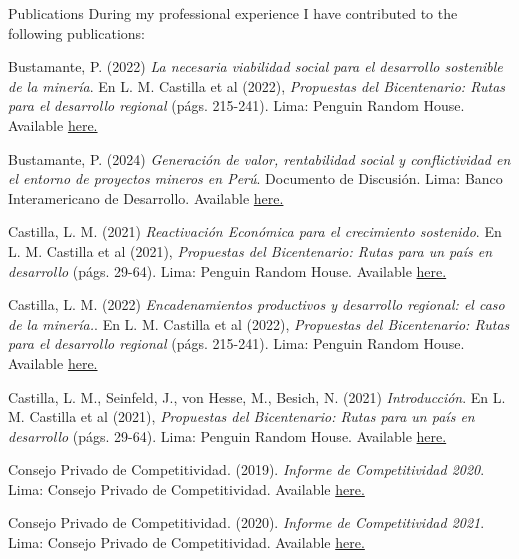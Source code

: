 \documentclass{resume} %
\begin{document}
\begin{rSection}{Publications}
During my professional experience I have contributed to the following publications:
\item Bustamante, P. (2022) \emph{La necesaria viabilidad social para el desarrollo sostenible de la minería}. En L. M. Castilla et al (2022), \textit{Propuestas del Bicentenario: Rutas para el desarrollo regional} (págs. 215-241). Lima: Penguin Random House. Available \href{https://www.casadellibro.com/ebook-propuestas-del-bicentenario-ebook/9786125068026/13125397}{here.}
\item Bustamante, P. (2024) \emph{Generación de valor, rentabilidad social y conflictividad en el entorno de proyectos mineros en Perú}. Documento de Discusión. Lima: Banco Interamericano de Desarrollo. Available \href{https://publications.iadb.org/es/generacion-de-valor-rentabilidad-social-y-conflictividad-en-el-entorno-de-proyectos-mineros-en-peru}{here.}
\item Castilla, L. M. (2021) \emph{Reactivación Económica para el crecimiento sostenido}. En L. M. Castilla et al (2021), \textit{Propuestas del Bicentenario: Rutas para un país en desarrollo} (págs. 29-64). Lima: Penguin Random House. Available \href{https://www.casadellibro.com/ebook-propuestas-del-bicentenario-ebook/9786124272813/12336851}{here.}
\item Castilla, L. M. (2022) \emph{Encadenamientos productivos y desarrollo regional: el caso de la minería.}.  En L. M. Castilla et al (2022), \textit{Propuestas del Bicentenario: Rutas para el desarrollo regional} (págs. 215-241). Lima: Penguin Random House. Available \href{https://www.casadellibro.com/ebook-propuestas-del-bicentenario-ebook/9786125068026/13125397}{here.} 
\item Castilla, L. M., Seinfeld, J., von Hesse, M., Besich, N. (2021) \emph{Introducción}. En L. M. Castilla et al (2021), \textit{Propuestas del Bicentenario: Rutas para un país en desarrollo} (págs. 29-64). Lima: Penguin Random House. Available \href{https://www.casadellibro.com/ebook-propuestas-del-bicentenario-ebook/9786124272813/12336851}{here.}
\item Consejo Privado de Competitividad. (2019). \emph{Informe de Competitividad 2020}. Lima: Consejo Privado de Competitividad. Available \href{https://www.compite.pe/wp-content/uploads/2019/11/CPC_Peru_INC-2020_Libro-Web-Paginas.pdf}{here.}
\item Consejo Privado de Competitividad. (2020). \emph{Informe de Competitividad 2021}. Lima: Consejo Privado de Competitividad. Available \href{https://www.compite.pe/wp-content/uploads/2021/01/Informe-de-Competitividad-2021-CPC.pdf}{here.}
\end{rSection} 
\end{document}
